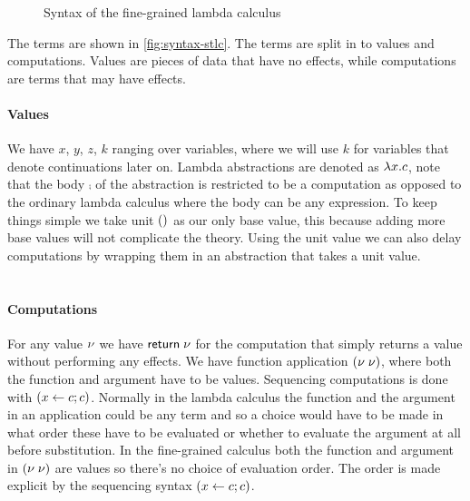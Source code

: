 {%

\begin{figure}
\caption{Syntax of the fine-grained lambda calculus}
\centering
{}
\end{figure}

The terms are shown in \cref{fig:syntax-stlc}.
The terms are split in to values and computations.
Values are pieces of data that have no effects, while computations are terms that may have effects.

\paragraph{Values} We have $x$, $y$, $z$, $k$ ranging over variables, where we will use $k$ for variables that denote continuations later on.
Lambda abstractions are denoted as $\lambda x . c$, note that the body $\comp$ of the abstraction is restricted to be a computation as opposed to the ordinary lambda calculus where the body can be any expression.
To keep things simple we take unit $()$ as our only base value, this because adding more base values will not complicate the theory.
Using the unit value we can also delay computations by wrapping them in an abstraction that takes a unit value.
\\\\
\paragraph{Computations} For any value $\nu$ we have $\mathsf{return} \; \nu$ for the computation that simply returns a value without performing any effects. We have function application $(\nu \; \nu)$, where both the function and argument have to be values. Sequencing computations is done with $(x \leftarrow c ; c)$. Normally in the lambda calculus the function and the argument in an application could be any term and so a choice would have to be made in what order these have to be evaluated or whether to evaluate the argument at all before substitution. In the fine-grained calculus both the function and argument in $(\nu \; \nu)$ are values so there's no choice of evaluation order. The order is made explicit by the sequencing syntax $(x \leftarrow c ; c)$.

}
